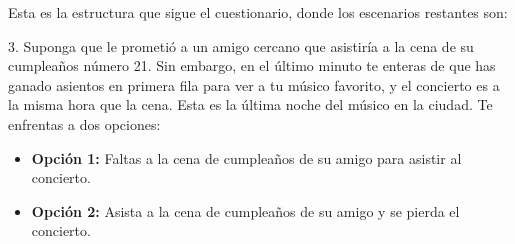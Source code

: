 \documentclass[12pt,spanish]{article}
\begin{document}
\begin{table}[H]
\centering
\caption{Variables exógenas según la elección realizada}
\end{table}

Esta es la estructura que sigue el cuestionario, donde los escenarios restantes son:

3. Suponga que le prometió a un amigo cercano que asistiría a la cena de su cumpleaños número 21. Sin embargo, en el último minuto te enteras de que has ganado asientos en primera fila para ver a tu músico favorito, y el concierto es a la misma hora que la cena. Esta es la última noche del músico en la ciudad. Te enfrentas a dos opciones:
\begin{itemize}
    \item \textbf{Opción 1:} Faltas a la cena de cumpleaños de su amigo para asistir al concierto.
    \item \textbf{Opción 2:} Asista a la cena de cumpleaños de su amigo y se pierda el concierto.
\end{itemize}
\end{document}
